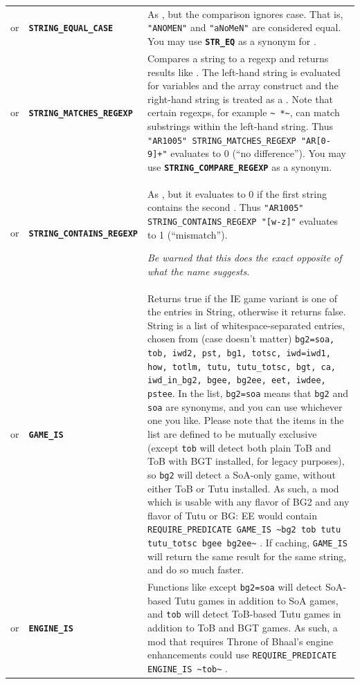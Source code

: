 \documentclass{article}
\def\ttref#1{\ahrefloc{#1}{\tt #1}}
\def\DEFINE#1{{\tt \bf #1}\label{#1}\index{#1}}
\def\t#1{{\tt #1}}
\begin{document}
\begin{tabular}{cp{10in}|p{10in}}
or & \ttref{String} \DEFINE{STRING_EQUAL_CASE} \ttref{String} &
As \ttref{STRING_EQUAL}, but the comparison ignores case. That is,
\t{"ANOMEN"} and \t{"aNoMeN"} are considered equal. You may use
\DEFINE{STR_EQ} as a synonym for \ttref{STRING_EQUAL_CASE}.\\

or & \ttref{String} \DEFINE{STRING_MATCHES_REGEXP} \ttref{String} &

Compares a string to a regexp and returns results like
\ttref{STRING_COMPARE_CASE}. The left-hand string is evaluated for
variables and the array construct and the right-hand string is treated
as a \ttref{regexp}. Note that certain regexps, for example
\verb+~ *~+, can match substrings within the left-hand string. Thus \t{"AR1005"
STRING_MATCHES_REGEXP "AR[0-9]+"} evaluates to 0 (``no
  difference''). You may use \DEFINE{STRING_COMPARE_REGEXP} as a
  synonym. \\

or & \ttref{String} \DEFINE{STRING_CONTAINS_REGEXP} \ttref{String} &
As \ttref{STRING_MATCHES_REGEXP}, but it evaluates to 0 if the first string
contains the second \ttref{regexp}. Thus \t{"AR1005" STRING_CONTAINS_REGEXP
"[w-z]"} evaluates to 1 (``mismatch'').

{\em Be warned that this does the exact opposite of what the name suggests.} \\

or & \DEFINE{GAME_IS} \ttref{Caching} \ttref{String} & Returns true if
the IE game variant is one of the entries in String, otherwise it
returns false. String is a list of whitespace-separated entries,
chosen from (case doesn't matter)
\verb+bg2=soa, tob, iwd2, pst, bg1, totsc, iwd=iwd1, how, totlm, tutu, tutu_totsc, bgt, ca, iwd_in_bg2, bgee, bg2ee, eet, iwdee, pstee+.
In the list, \verb+bg2=soa+ means that \verb+bg2+ and \verb+soa+ are
synonyms, and you can use whichever one you like. Please note that the
items in the list are defined to be mutually exclusive (except
\verb+tob+ will detect both plain ToB and ToB with BGT installed, for
legacy purposes), so \verb+bg2+ will detect a SoA-only game, without
either ToB or Tutu installed. As such, a mod which is usable with any
flavor of BG2 and any flavor of Tutu or BG: EE would contain
\verb+REQUIRE_PREDICATE GAME_IS ~bg2 tob tutu tutu_totsc bgee bg2ee~+
. If caching, \t{GAME_IS} will return the same result for the same
string, and do so much faster. \\

or & \DEFINE{ENGINE_IS} \ttref{Caching} \ttref{String} &
Functions like \ttref{GAME_IS} except \verb+bg2=soa+ will detect
SoA-based Tutu games in addition to SoA games, and \verb+tob+ will
detect ToB-based Tutu games in addition to ToB and BGT games.  As
such, a mod that requires Throne of Bhaal's engine enhancements could
use \verb+REQUIRE_PREDICATE ENGINE_IS ~tob~+ . \\


\end{tabular}
\end{document}
